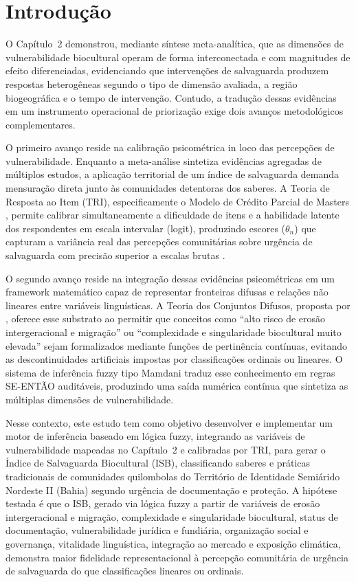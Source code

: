 \newpage

\section{Introdução}

O Capítulo~2 demonstrou, mediante síntese meta-analítica, que as dimensões de vulnerabilidade biocultural operam de forma interconectada e com magnitudes de efeito diferenciadas, evidenciando que intervenções de salvaguarda produzem respostas heterogêneas segundo o tipo de dimensão avaliada, a região biogeográfica e o tempo de intervenção. Contudo, a tradução dessas evidências em um instrumento operacional de priorização exige dois avanços metodológicos complementares.

O primeiro avanço reside na calibração psicométrica in loco das percepções de vulnerabilidade. Enquanto a meta-análise sintetiza evidências agregadas de múltiplos estudos, a aplicação territorial de um índice de salvaguarda demanda mensuração direta junto às comunidades detentoras dos saberes. A Teoria de Resposta ao Item (TRI), especificamente o Modelo de Crédito Parcial de Masters \cite{Masters1982}, permite calibrar simultaneamente a dificuldade de itens e a habilidade latente dos respondentes em escala intervalar (logit), produzindo escores ($\theta_n$) que capturam a variância real das percepções comunitárias sobre urgência de salvaguarda com precisão superior a escalas brutas \cite{Bond2020,Rasch1960}.

O segundo avanço reside na integração dessas evidências psicométricas em um framework matemático capaz de representar fronteiras difusas e relações não lineares entre variáveis linguísticas. A Teoria dos Conjuntos Difusos, proposta por , oferece esse substrato ao permitir que conceitos como ``alto risco de erosão intergeracional e migração'' ou ``complexidade e singularidade biocultural muito elevada'' sejam formalizados mediante funções de pertinência contínuas, evitando as descontinuidades artificiais impostas por classificações ordinais ou lineares. O sistema de inferência fuzzy tipo Mamdani \cite{Mamdani1975} traduz esse conhecimento em regras SE-ENTÃO auditáveis, produzindo uma saída numérica contínua que sintetiza as múltiplas dimensões de vulnerabilidade.

Nesse contexto, este estudo tem como objetivo desenvolver e implementar um motor de inferência baseado em lógica fuzzy, integrando as variáveis de vulnerabilidade mapeadas no Capítulo~2 e calibradas por TRI, para gerar o Índice de Salvaguarda Biocultural (ISB), classificando saberes e práticas tradicionais de comunidades quilombolas do Território de Identidade Semiárido Nordeste II (Bahia) segundo urgência de documentação e proteção. A hipótese testada é que o ISB, gerado via lógica fuzzy a partir de variáveis de erosão intergeracional e migração, complexidade e singularidade biocultural, status de documentação, vulnerabilidade jurídica e fundiária, organização social e governança, vitalidade linguística, integração ao mercado e exposição climática, demonstra maior fidelidade representacional à percepção comunitária de urgência de salvaguarda do que classificações lineares ou ordinais.


